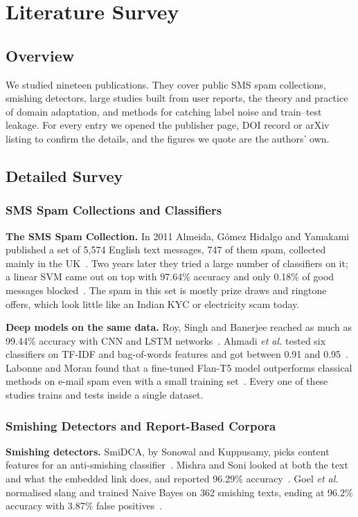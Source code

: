 \chapter{Literature Survey}
\section{Overview}
We studied nineteen publications. They cover public SMS spam collections, smishing detectors, large studies built from user reports, the theory and practice of domain adaptation, and methods for catching label noise and train--test leakage. For every entry we opened the publisher page, DOI record or arXiv listing to confirm the details, and the figures we quote are the authors' own.

\section{Detailed Survey}
\subsection{SMS Spam Collections and Classifiers}
\textbf{The SMS Spam Collection.} In 2011 Almeida, G\'omez Hidalgo and Yamakami published a set of 5,574 English text messages, 747 of them spam, collected mainly in the UK~\cite{almeida2011contributions}. Two years later they tried a large number of classifiers on it; a linear SVM came out on top with 97.64\% accuracy and only 0.18\% of good messages blocked~\cite{almeida2013towards}. The spam in this set is mostly prize draws and ringtone offers, which look little like an Indian KYC or electricity scam today.

\textbf{Deep models on the same data.} Roy, Singh and Banerjee reached as much as 99.44\% accuracy with CNN and LSTM networks~\cite{roy2020deep}. Ahmadi \textit{et al.} tested six classifiers on TF-IDF and bag-of-words features and got between 0.91 and 0.95~\cite{ahmadi2025llm}. Labonne and Moran found that a fine-tuned Flan-T5 model outperforms classical methods on e-mail spam even with a small training set~\cite{labonne2023spamt5}. Every one of these studies trains and tests inside a single dataset.

\subsection{Smishing Detectors and Report-Based Corpora}
\textbf{Smishing detectors.} SmiDCA, by Sonowal and Kuppusamy, picks content features for an anti-smishing classifier~\cite{sonowal2018smidca}. Mishra and Soni looked at both the text and what the embedded link does, and reported 96.29\% accuracy~\cite{mishra2020smishing}. Goel \textit{et al.} normalised slang and trained Naive Bayes on 362 smishing texts, ending at 96.2\% accuracy with 3.87\% false positives~\cite{goel2024ml}.

